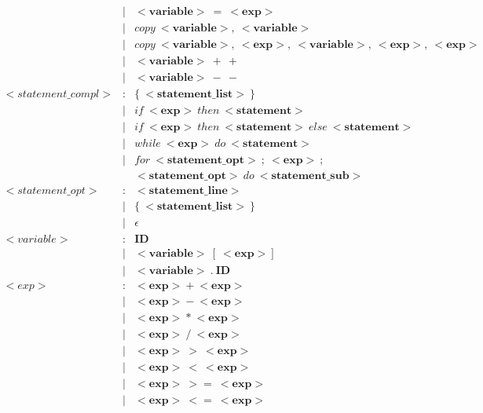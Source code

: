 \documentclass{article}
\begin{document}
\begin{align*}
    & | & <\boldsymbol{variable}>\ =\ <\boldsymbol{exp}>\ \\
    & | & copy\ <\boldsymbol{variable}>,\ <\boldsymbol{variable}> \\  
    & | & copy\ <\boldsymbol{variable}>,\ <\boldsymbol{exp}>,\ <\boldsymbol{variable}>,\ <\boldsymbol{exp}>,\ <\boldsymbol{exp}> \\
    & | & <\boldsymbol{variable}>\ +\ +\ \\
    & | & <\boldsymbol{variable}>\ -\ -\ \\
    <statement\_compl> & : & \{\ <\boldsymbol{statement\_list}>\ \} \\ 
    & | & if\ <\boldsymbol{exp}>\ then\ <\boldsymbol{statement}>\ \\
    & | & if\ <\boldsymbol{exp}>\ then\ <\boldsymbol{statement}>\ else\ <\boldsymbol{statement}> \\
    & | & while\ <\boldsymbol{exp}>\ do\ <\boldsymbol{statement}>\ \\
    & | & for\ <\boldsymbol{statement\_opt}>\ ;\ <\boldsymbol{exp}>\ ;\ \\
    & &<\boldsymbol{statement\_opt}>\ do\  <\boldsymbol{statement\_sub}>\\
    <statement\_opt> & : & <\boldsymbol{statement\_line}> \\
    & | & \{\ <\boldsymbol{statement\_list}>\ \} \\
    & | & \epsilon \\ 
    <variable> & : & \boldsymbol{ID} \\
    & | & <\boldsymbol{variable}>\ [\ <\boldsymbol{exp}>] \\
    & | & <\boldsymbol{variable}>\ .\ \boldsymbol{ID}\\
    <exp>& : & <\boldsymbol{exp}>\ \boldsymbol{+}\ <\boldsymbol{exp}> \\
    & | & <\boldsymbol{exp}>\ \boldsymbol{-}\ <\boldsymbol{exp}>\ \\
    & | & <\boldsymbol{exp}>\ \boldsymbol{*}\ <\boldsymbol{exp}>\ \\
    & | & <\boldsymbol{exp}>\ \boldsymbol{/}\ <\boldsymbol{exp}>\ \\
    & | & <\boldsymbol{exp}>\ \boldsymbol{>}\ <\boldsymbol{exp}>\ \\
    & | & <\boldsymbol{exp}>\ \boldsymbol{<}\ <\boldsymbol{exp}>\ \\
    & | & <\boldsymbol{exp}>\ \boldsymbol{>=}\ <\boldsymbol{exp}>\ \\
    & | & <\boldsymbol{exp}>\ \boldsymbol{<=}\ <\boldsymbol{exp}>\ \\

\end{align*}
\end{document}
